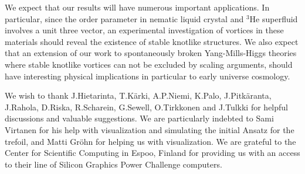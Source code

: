 We expect that our results will have numerous
important
applications. In particular, 
since the order parameter in nematic liquid
crystal and $^3$He superfluid 
involves a unit three vector, an experimental
investigation of vortices in these materials
should reveal the existence
of stable knotlike structures. We also expect that
an extension of our work to spontaneously
broken Yang-Mills-Higgs theories
where stable knotlike vortices can
not be excluded by scaling arguments, should have 
interesting physical implications in particular
to early universe cosmology.   


\vskip 1.0cm
We wish to thank  J.Hietarinta, T.K\"arki,   
A.P.Niemi, K.Palo, J.Pitk\"aranta, J.Rahola, D.Riska, 
R.Scharein, 
G.Sewell,  O.Tirkkonen and J.Tulkki for helpful discussions
and valuable suggestions.
We are particularly indebted to Sami Virtanen for his help
with visualization and simulating the initial Ansatz for
the trefoil, and Matti Gr\"ohn for helping us
with visualization. We are grateful to the Center
for Scientific Computing in Espoo, Finland for 
providing us with an access to their line of
Silicon Graphics Power Challenge computers.

\vfill\eject
 
 
\vskip 1.0cm

